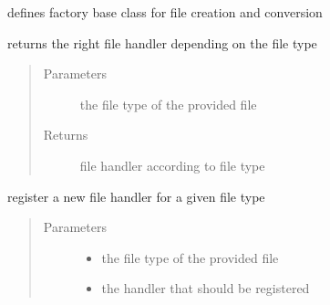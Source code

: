 \documentclass[letterpaper,10pt,english]{sphinxmanual}
\begin{document}
\begin{fulllineitems}
\label{\detokenize{eventLogConverter:eventLogConverter.fileHandlerBase.FileHandlerFactory}}
defines factory base class for file creation and conversion

\begin{fulllineitems}
\label{\detokenize{eventLogConverter:eventLogConverter.fileHandlerBase.FileHandlerFactory.create}}
returns the right file handler depending on the file type
\begin{quote}\begin{description}
\item[{Parameters}] \leavevmode
{} \textendash{} the file type of the provided file

\item[{Returns}] \leavevmode
file handler according to file type

\end{description}\end{quote}

\end{fulllineitems}


\begin{fulllineitems}
\label{\detokenize{eventLogConverter:eventLogConverter.fileHandlerBase.FileHandlerFactory.register}}
register a new file handler for a given file type
\begin{quote}\begin{description}
\item[{Parameters}] \leavevmode\begin{itemize}
\item {} 
 \textendash{} the file type of the provided file

\item {} 
 \textendash{} the handler that should be registered

\end{itemize}

\end{description}\end{quote}

\end{fulllineitems}


\end{fulllineitems}
\end{document}
